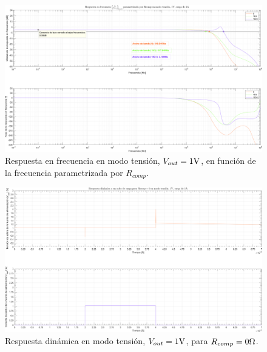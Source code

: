 \clearpage

\begin{figure}[H] %
\begin{center}
\includegraphics[width=1.1 \textwidth, angle=90]{./img/plots/rf/power_supply_RCOMP_RF_Modo2.png}
\caption{\label{fig:fig_power_supply_RCOMP_RF_Modo2}\footnotesize{Respuesta en frecuencia en modo tensión, $V_{out} = 1 \si[per-mode=symbol]{\volt}$, en función de la frecuencia parametrizada por $R_{comp}$.}}
\end{center}
\end{figure}

\clearpage

\begin{figure}[H] %
\begin{center}
\includegraphics[width=1.1 \textwidth, angle=90]{./img/plots/dynamic/power_supply_RCOMP_0_STEP_Modo2.png}
\caption{\label{fig:fig_power_supply_RCOMP_STEP_5n_Modo2}\footnotesize{Respuesta dinámica en modo tensión, $V_{out} = 1 \si[per-mode=symbol]{\volt}$, para $R_{comp} = 0 \si[per-mode=symbol]{\ohm} $.}}
\end{center}
\end{figure}

